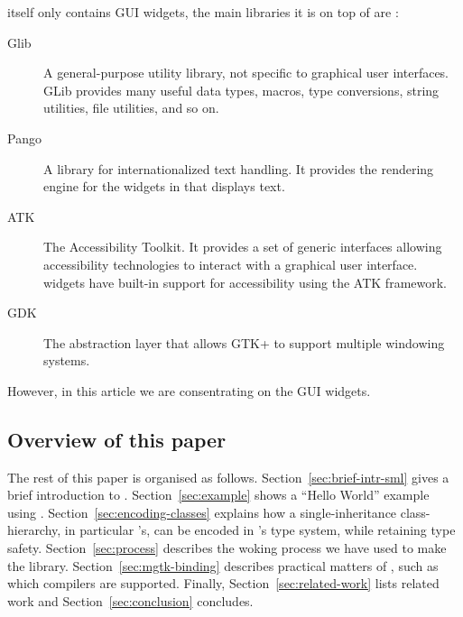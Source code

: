 \documentclass[workingdraft]{usetex-v1}
\begin{document}
\gtk itself only contains GUI widgets, the main libraries it is on top
of are \cite{gtk-reference-manual}: 
\begin{description}
\item[Glib] A general-purpose utility library, not specific to
  graphical user interfaces. GLib provides many useful data types,
  macros, type conversions, string utilities, file utilities, and so
  on.

\item[Pango] A library for internationalized text handling. It
  provides the rendering engine for the widgets in \gtk that displays
  text.

\item[ATK] The Accessibility Toolkit. It provides a set of generic
  interfaces allowing accessibility technologies to interact with a
  graphical user interface.  \gtk widgets have built-in support for
  accessibility using the ATK framework.

\item[GDK] The abstraction layer that allows GTK+ to support multiple
  windowing systems.
\end{description}
However, in this article we are consentrating on the GUI widgets.






\subsection{Overview of this paper}
\label{sec:overview-this-paper}

The rest of this paper is organised as follows.
Section~\ref{sec:brief-intr-sml} gives a brief introduction to \sml.
Section~\ref{sec:example} shows a ``Hello World'' example using \mgtk.
Section~\ref{sec:encoding-classes} explains how a single-inheritance
class-hierarchy, in particular \gtk's, can be encoded in \sml's type
system, while retaining type safety.  Section~\ref{sec:process}
describes the woking process we have used to make the \mgtk library.
Section~\ref{sec:mgtk-binding} describes practical matters of \mgtk,
such as which \sml compilers are supported.  Finally,
Section~\ref{sec:related-work} lists related work and
Section~\ref{sec:conclusion} concludes.
\end{document}

